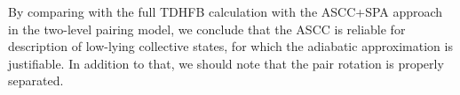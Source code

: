 \documentclass[11pt]{book} %
\begin{document}
%
%

By comparing with the full TDHFB calculation with the ASCC+SPA approach
in the two-level pairing model,
we conclude that the ASCC is reliable for description of low-lying
collective states, for which the adiabatic approximation is justifiable.
In addition to that, we should note that the pair rotation is properly separated.
\end{document}

